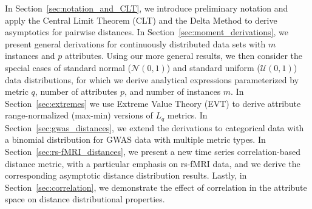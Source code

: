 \documentclass[10pt,letterpaper]{article}
\begin{document}
In Section~\ref{sec:notation_and_CLT}, we introduce preliminary notation and apply the Central Limit Theorem (CLT) and the Delta Method to derive asymptotics for pairwise distances. In Section~\ref{sec:moment_derivations}, we present general derivations for continuously distributed data sets with $m$ instances and $p$ attributes. Using our more general results, we then consider the special cases of standard normal ($\mathcal{N}(0,1)$) and standard uniform ($\mathcal{U}(0,1)$) data distributions, for which we derive analytical expressions parameterized by metric $q$, number of attributes $p$, and number of instances $m$. In Section~\ref{sec:extremes} we use Extreme Value Theory (EVT) to derive attribute range-normalized (max-min) versions of $L_q$ metrics. In Section~\ref{sec:gwas_distances}, we extend the derivations to categorical data with a binomial distribution for GWAS data with multiple metric types. In Section~\ref{sec:rs-fMRI_distances}, we present a new time series correlation-based distance metric, with a particular emphasis on rs-fMRI data, and we derive the corresponding asymptotic distance distribution results. Lastly, in Section~\ref{sec:correlation}, we demonstrate the effect of correlation in the attribute space on distance distributional properties. 
\end{document}
